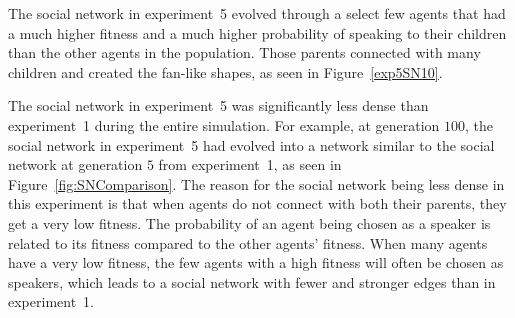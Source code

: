 The social network in experiment~5 evolved through a select few agents that had a much higher fitness and a much higher probability of speaking to their children than the other agents in the population. Those parents connected with many children and created the fan-like shapes, as seen in Figure~\ref{exp5SN10}. 

The social network in experiment~5 was significantly less dense than experiment~1 during the entire simulation. For example, at generation $100$, the social network in experiment~5 had evolved into a network similar to the social network at generation $5$ from experiment~1, as seen in Figure~\ref{fig:SNComparison}. The reason for the social network being less dense in this experiment is that when agents do not connect with both their parents, they get a very low fitness. The probability of an agent being chosen as a speaker is related to its fitness compared to the other agents' fitness. When many agents have a very low fitness, the few agents with a high fitness will often be chosen as speakers, which leads to a social network with fewer and stronger edges than in experiment~1.

